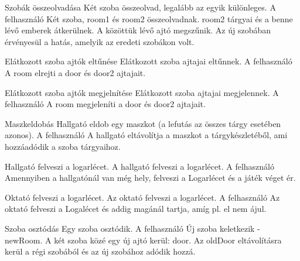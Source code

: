 \begin{use-case}
    {Szobák összeolvadása}
    {Két szoba összeolvad, legalább az egyik különleges.}
    {A felhasználó}
    Két szoba, room1 és room2 összeolvadnak. room2 tárgyai és a benne lévő emberek átkerülnek. A közöttük lévő ajtó megszűnik. Az új szobában érvényesül a hatás, amelyik az eredeti szobákon volt.
\end{use-case}

\begin{use-case}
    {Elátkozott szoba ajtók eltűnése}
    {Elátkozott szoba ajtajai eltűnnek.}
    {A felhasználó}
    A room elrejti a door és door2 ajtajait.
\end{use-case}

\begin{use-case}
    {Elátkozott szoba ajtók megjelnítése}
    {Elátkozott szoba ajtajai megjelennek.}
    {A felhasználó}
    A room megjeleníti a door és door2 ajtajait.
\end{use-case}

\begin{use-case}
    {Maszkeldobás}
    {Hallgató eldob egy maszkot (a lefutás az összes tárgy esetében azonos).}
    {A felhasználó}
    A hallgató eltávolítja a maszkot a tárgykészletéből, ami hozzáadódik a szoba tárgyaihoz.
\end{use-case}

\begin{use-case}
    {Hallgató felveszi a logarlécet.}
    {A hallgató felveszi a logarlécet.}
    {A felhasználó}
    Amennyiben a hallgatónál van még hely, felveszi a Logarlécet és a játék véget ér.
\end{use-case}

\begin{use-case}
    {Oktató felveszi a logarlécet.}
    {Az oktató felveszi a logarlécet.}
    {A felhasználó}
    Az oktató felveszi a Logalécet és addig magánál tartja, amíg pl. el nem ájul.
\end{use-case}

\begin{use-case}
    {Szoba osztódás}
    {Egy szoba osztódik.}
    {A felhasználó}
   Új szoba keletkezik - newRoom. A két szoba közé egy új ajtó kerül: door. Az oldDoor eltávolításra kerül a régi szobából és az új szobához adódik hozzá. 
\end{use-case}

